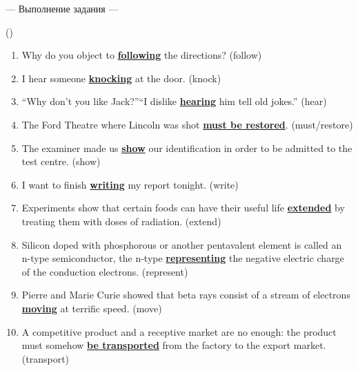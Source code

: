 \documentclass[main.tex]{subfiles}
\begin{document}
\hypertarget{ltask:2024-04-03-2}{--- Выполнение задания ---} (\hyperref[task:2024-04-03-2]{\color{blue}{перейти к тексту задания}})
\\

\vspace{5pt}
\begin{enumerate}[nosep, leftmargin=*]
	\itemsep\eitsp
	\item Why do you object to \uline{\textbf{following}} the directions? (follow)
	\item I hear someone \uline{\textbf{knocking}} at the door. (knock)
	\item ``Why don't you like Jack?''\newline ``I dislike \uline{\textbf{hearing}} him tell old jokes.'' (hear)
	\item The Ford Theatre where Lincoln was shot \uline{\textbf{must be restored}}. (must/restore)
	\item The examiner made us \uline{\textbf{show}} our identification in order to be admitted to the test centre. (show)
	\item I want to finish \uline{\textbf{writing}} my report tonight. (write)
	\item Experiments show that certain foods can have their useful life \uline{\textbf{extended}} by treating them with doses of radiation. (extend)
	\item Silicon doped with phosphorous or another pentavalent element is called an n-type semiconductor, the n-type \uline{\textbf{representing}} the negative electric charge of the conduction electrons. (represent)
	\item Pierre and Marie Curie showed that beta rays consist of a stream of electrons \uline{\textbf{moving}} at terrific speed. (move)
	\item A competitive product and a receptive market are no enough: the product must somehow \uline{\textbf{be transported}} from the factory to the export market. (transport)
\end{enumerate}
\end{document}
